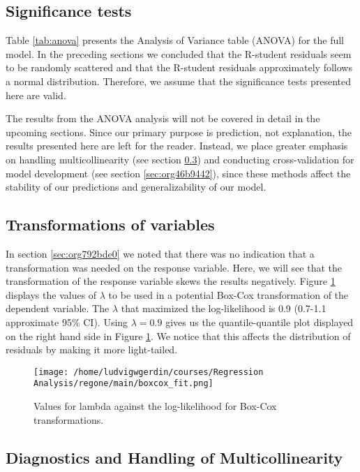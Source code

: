 \documentclass[11pt]{article}
\begin{document}
\subsection{Significance tests}
\label{sec:org40f51e5}

Table \ref{tab:anova} presents the Analysis of Variance table (ANOVA) for the full model. In the 
preceding sections we concluded that the R-student residuals seem to be randomly scattered and 
that the R-student residuals approximately follows a normal distribution. Therefore, we assume 
that the significance tests presented here are valid. 

The results from the ANOVA analysis will not be covered in detail in the upcoming sections. Since
our primary purpose is prediction, not explanation, the results presented here are left for the 
reader. Instead, we place greater emphasis on handling multicollinearity 
(see section \ref{sec:org87b0fbd}) and conducting
cross-validation for model development (see section \ref{sec:org46b9442}),
since these methods affect the stability of our predictions and generalizability of our model.



\subsection{Transformations of variables}
\label{sec:org4648380}

In section \ref{sec:org792bde0} we noted that there was no indication that a transformation was needed on the 
response variable. Here, we will see that the transformation of the response variable skews the results negatively.
Figure \ref{fig:org1218f8a} displays the values of \(\lambda\) to be used in a potential Box-Cox transformation of 
the dependent variable. The \(\lambda\) that maximized the log-likelihood is 0.9 
(0.7-1.1 approximate 95\% CI). Using \(\lambda = 0.9\) gives us the quantile-quantile plot displayed on the 
right hand side in Figure \ref{fig:org1218f8a}. We notice that this affects the distribution of residuals by
making it more light-tailed. 

\begin{figure}[H]
\centering
\texttt{[image: /home/ludvigwgerdin/courses/Regression Analysis/regone/main/boxcox\_fit.png]}
\caption{\label{fig:org1218f8a}
Values for lambda against the log-likelihood for Box-Cox transformations.}
\end{figure}

\subsection{Diagnostics and Handling of Multicollinearity}
\label{sec:org87b0fbd}
\end{document}
